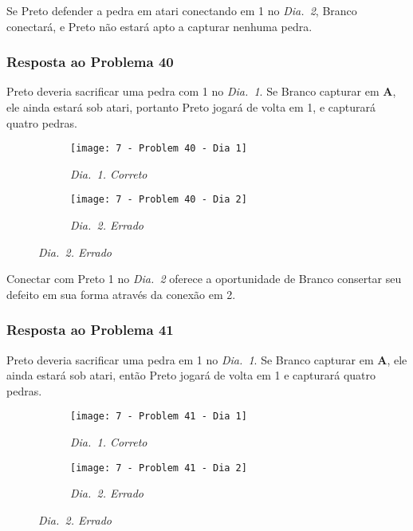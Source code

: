 Se Preto defender a pedra em atari conectando em 1 no \emph{Dia.\@~2}, Branco conectará, e Preto não estará apto a capturar nenhuma pedra.

\pagebreak

\subsubsection*{Resposta ao Problema 40}

Preto deveria sacrificar uma pedra com 1 no \emph{Dia.\@~1}. Se Branco capturar em \textbf{A}, ele ainda estará sob atari, portanto Preto jogará de volta em 1, e capturará quatro pedras.

\begin{figure}[h!]
    \centering
    \begin{subfigure}[t]{.425\textwidth}
        \texttt{[image: 7 - Problem 40 - Dia 1]}
        \captionsetup{justification=centering}
        \caption*{\emph{Dia.\@~1. Correto}}
    \end{subfigure}
    \hspace{1cm}
    \begin{subfigure}[t]{.425\textwidth}
        \texttt{[image: 7 - Problem 40 - Dia 2]}
        \captionsetup{justification=centering}
        \caption*{\emph{Dia.\@~2. Errado}}
    \end{subfigure}
\end{figure}

Conectar com Preto 1 no \emph{Dia.\@~2} oferece a oportunidade de Branco consertar seu defeito em sua forma através da conexão em 2.

\pagebreak

\subsubsection*{Resposta ao Problema 41}

Preto deveria sacrificar uma pedra em 1 no \emph{Dia.\@~1}. Se Branco capturar em \textbf{A}, ele ainda estará sob atari, então Preto jogará de volta em 1 e capturará quatro pedras.
    
\begin{figure}[h!]
    \centering
    \begin{subfigure}[t]{.425\textwidth}
        \texttt{[image: 7 - Problem 41 - Dia 1]}
        \captionsetup{justification=centering}
        \caption*{\emph{Dia.\@~1. Correto}}
    \end{subfigure}
    \hspace{1cm}
    \begin{subfigure}[t]{.425\textwidth}
        \texttt{[image: 7 - Problem 41 - Dia 2]}
        \captionsetup{justification=centering}
        \caption*{\emph{Dia.\@~2. Errado}}
    \end{subfigure}
\end{figure}

